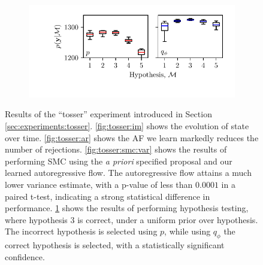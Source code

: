 \begin{figure}[t]
    \begin{subfigure}[t]{0.48\textwidth}
        \centering
        \includegraphics[width=\textwidth]{./figures/tosser/TosserNF_cluster_2019_09_28_09_45_55/tosser_box_plot.pdf}
        \caption{ }
    \label{fig:tosser_hyp}
    \end{subfigure}
    \vspace{-0.2cm}
    \caption{Results of the ``tosser'' experiment introduced in Section \ref{sec:experiments:tosser}.
    \ref{fig:tosser:im} shows the evolution of state over time.
    \ref{fig:tosser:ar} shows the AF we learn markedly reduces the number of rejections.
    \ref{fig:tosser:smc:var} shows the results of performing SMC using the \emph{a priori} specified proposal and our learned autoregressive flow. 
    The autoregressive flow attains a much lower variance estimate, with a p-value of less than $0.0001$ in a paired t-test, indicating a strong statistical difference in performance.
    \ref{fig:tosser_hyp} shows the results of performing hypothesis testing, where hypothesis $3$ is correct, under a uniform prior over hypothesis. 
    The incorrect hypothesis is selected using $p$, while using $q_{\phi}$ the correct hypothesis is selected, with a statistically significant confidence.
    }
    \label{fig:tosser}
\end{figure}